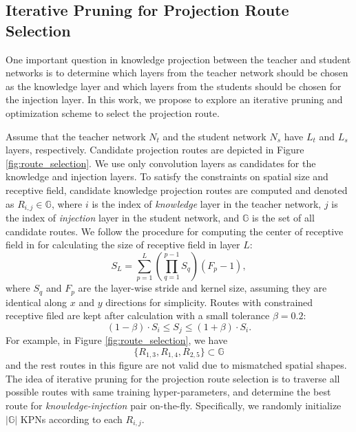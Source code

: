 \documentclass[journal]{IEEEtran}
\begin{document}
\subsection{Iterative Pruning for Projection Route Selection}
One important question in knowledge projection between the teacher and student networks is to determine which layers from the teacher network should be chosen as the knowledge layer and which layers from the students should be chosen for the injection layer. In this work, we propose to explore an iterative pruning and optimization scheme to select the projection route.

Assume that the teacher network $N_t$ and the student network $N_s$ have $L_t$ and $L_s$ layers, respectively. Candidate projection routes are depicted in Figure \ref{fig:route_selection}. We use only convolution layers as candidates for the knowledge and  injection layers. To satisfy the constraints on spatial size and receptive field, candidate knowledge projection routes are computed and denoted as $R_{i, j} \in \mathbb{G} $, where $i$ is the index of \textit{knowledge} layer in the teacher network, $j$ is the index of \textit{injection} layer in the student network, and $\mathbb{G}$ is the set of all candidate routes. We follow the procedure for computing the center of receptive field in \cite{lenc2015r} for calculating the size of receptive field in layer $L$:
\begin{equation}
\label{eq:receptive_field}
    S_L = \sum_{p=1}^{L}{(\prod_{q=1}^{p-1}{S_q}) (F_p - 1)},
\end{equation}
where $S_q$ and $F_p$ are the layer-wise stride and kernel size, assuming they are identical along $x$ and $y$ directions for simplicity. Routes with constrained receptive filed are kept after calculation with a small tolerance $\beta=0.2$:
\begin{equation}
\label{eq:tolerance}
    (1-\beta) \cdot S_i \le S_j \le (1+\beta) \cdot S_i.
\end{equation}
For example, in Figure \ref{fig:route_selection}, we have 
\begin{equation}
\{R_{1, 3}, R_{1, 4}, R_{2,5}\} \subset \mathbb{G}
\end{equation}
 and the rest routes in this figure are not valid due to mismatched spatial shapes. The idea of iterative pruning for the projection route selection is to traverse all possible routes with same training hyper-parameters, and determine the best route for \textit{knowledge-injection} pair on-the-fly. Specifically, we randomly initialize $|\mathbb{G}|$ KPNs according to each $R_{i, j}$. 
 
\end{document}
